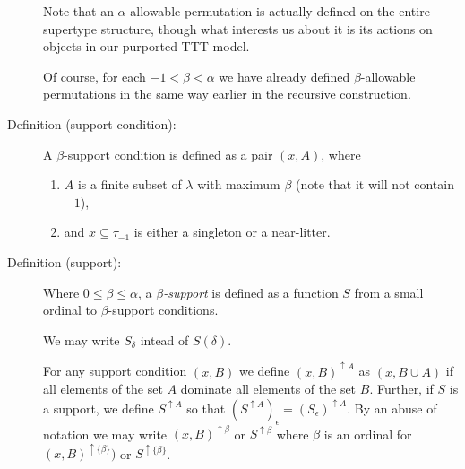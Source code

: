 \documentclass[112pt]{article}
\begin{document}
\begin{description}
Note that an $\alpha$-allowable permutation is actually defined on the entire supertype structure, though what interests us about it is its actions on objects in our purported TTT model.

Of course, for each $-1<\beta<\alpha$ we have already defined $\beta$-allowable permutations in the same way earlier in the recursive construction.




\item[Definition (support condition):]  A $\beta$-support condition is defined as a pair $(x,A)$, where 
\begin{enumerate}

\item $A$ is a finite subset of $\lambda$  with maximum $\beta$ (note that it will not contain $-1$), 

\item and $x\subseteq \tau_{-1}$ is either a singleton or a near-litter.

\end{enumerate}

\item[Definition (support):]  Where $0\leq\beta \leq \alpha$, a {\em $\beta$-support\/} is defined as a function $S$ from a small ordinal to $\beta$-support conditions.

   We may write $S_\delta$ intead of $S(\delta)$.

For any support condition $(x,B)$ we define $(x,B)^{\uparrow A}$ as $(x,B\cup A)$ if all elements of the set $A$ dominate all elements of the set $B$.
Further, if $S$ is a support, we define $S^{\uparrow A}$ so that $(S^{\uparrow A})_\epsilon = (S_\epsilon)^{\uparrow A}$.  By an abuse of notation we may write $(x,B)^{\uparrow \beta}$ or $S^{\uparrow \beta}$ where $\beta$ is an ordinal for $(x,B)^{\uparrow \{\beta\}})$ or $S^{\uparrow \{\beta\}}$.

\begin{comment}

We make the formal requirement on supports
that if the range of a support contains $(x,A)$ and $(y,A)$ where $x,y$ are typed near-litters and either $(x \Delta y)\cap \tau_{-1}$ or $(x \cap y) \cap \tau_{-1}$ is small, that all $(z,A)$ with $z\cap \tau_{-1}$ a singleton subset of this small set are included in the range of the support.

For any supports $S$ and $T$ we denote by $S+T$ a support which consists
of $S$, followed by $T$, followed by the atoms which need to be added to make this a support (to make it satisfy the additional condition):  what this means is that $(S+T)_\epsilon = S(\epsilon)$ [which we write $S_\epsilon$] for $\epsilon$ in the domain of $S$, $(S+T)_{{\tt dom}(S)+\epsilon} = T_\epsilon$ for $\epsilon$ in the domain of $T$, and the rest of the range of $S+T$ consists of the support conditions with atomic first component  which must be added to satisfy the additional condition [this is not uniquely determined:  supports usually have many possible sums because the needed additional conditions can be added in any order.]
\end{comment}


\end{description}
\end{document}
